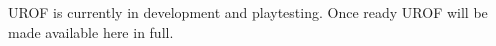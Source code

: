 UROF is currently in development and playtesting. Once ready UROF will be made available here in full.
